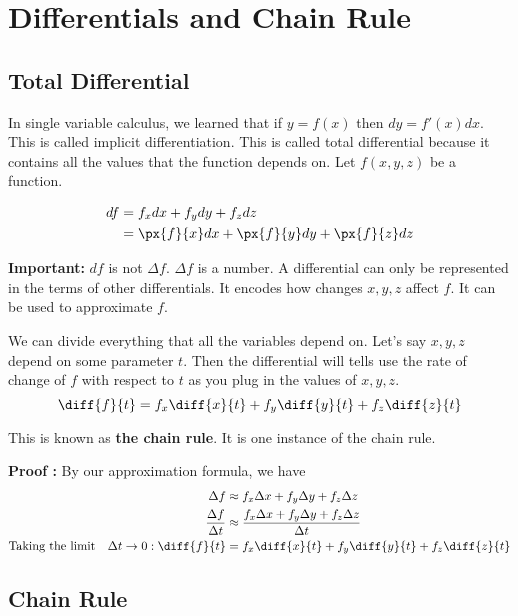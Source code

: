 

\chapter{Differentials and Chain Rule}

\bigbreak
\section{Total Differential}

In single variable calculus, we learned that if $y = f(x)$ then $dy = f'(x)dx$. This is called implicit differentiation.
This is called total differential because it contains all the values that the function depends on.
Let $f(x, y, z)$ be a function.

\begin{align*}
    df  & = f_x dx + f_y dy + f_z dz \\
        & = \px{f}{x} dx + \px{f}{y} dy + \px{f}{z} dz
\end{align*}

{\bf Important:} $df$ is not $\Delta f$. $\Delta f$ is a number.
A differential can only be represented in the terms of other differentials.
It encodes how changes $x, y, z$ affect $f$. It can be used to approximate $f$.

We can divide everything that all the variables depend on. 
Let's say $x, y, z$ depend on some parameter $t$. 
Then the differential will tells use the rate of change of $f$ with respect to $t$ as you plug in the values of $x, y, z$.
$$
\diff{f}{t} = f_x \diff{x}{t} + f_y \diff{y}{t} + f_z \diff{z}{t}
$$

This is known as {\bf the chain rule}. It is one instance of the chain rule.

{\bf Proof : } By our approximation formula, we have
\begin{align*}
\Delta f & \approx f_x \Delta x + f_y \Delta y + f_z \Delta z \\
\frac{\Delta f}{\Delta t} & \approx  \frac{ f_x \Delta x + f_y \Delta y + f_z \Delta z }{ \Delta t } \\
\text{Taking the limit} \quad \Delta t \to 0 : \diff{f}{t} & = f_x \diff{x}{t} + f_y \diff{y}{t} + f_z \diff{z}{t}
\end{align*}


\section{Chain Rule}


